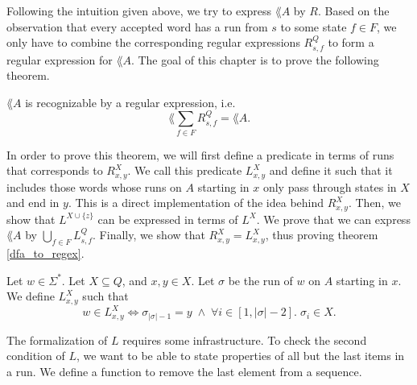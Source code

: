 

Following the intuition given above, we try to express $\lang{A}$ by $R$.
Based on the observation that every accepted word has a run from $s$ to some state $f \in F$, 
we only have to combine the corresponding regular expressions $R^Q_{s,f}$ to form a regular expression for $\lang{A}$.
The goal of this chapter is to prove the following theorem. 

\begin{theorem}
    \label{dfa_to_regex} $\lang{A}$ is recognizable by a regular expression, i.e.
    \begin{equation*}
        \lang{\sum\limits_{f \in F} R^Q_{s,f}} = \lang{A}.
    \end{equation*}
\end{theorem}

In order to prove this theorem, we will first define a predicate in terms of runs that corresponds to $R^X_{x,y}$.
We call this predicate $L^X_{x,y}$ and define it such that it includes those words 
whose runs on $A$ starting in $x$ only pass through states in $X$ and end in $y$.
This is a direct implementation of the idea behind $R^X_{x,y}$.
Then, we show that $L^{X \cup \{z\}}$ can be expressed in terms of $L^X$.
We prove that we can express $\lang{A}$ by $\bigcup_{f\in F} L^Q_{s,f}$.
Finally, we show that $R^X_{x,y} = L^X_{x,y}$, thus proving theorem \ref{dfa_to_regex}.

\begin{definition}
    Let $w \in \Sigma^*$.
    Let $X \subseteq Q$, and $x,y \in X$.
    Let $\sigma$ be the run of $w$ on $A$ starting in $x$.
    We define $L^X_{x,y}$ such that
    \begin{equation*}
        w \in L^X_{x,y} \iff \sigma_{|\sigma|-1} = y \; \wedge \; \forall i \in [1,|\sigma|-2]. \; \sigma_i \in X.
    \end{equation*}
\end{definition}

The formalization of $L$ requires some infrastructure. 
To check the second condition of $L$, we want to be able to state properties of all but the last items in a run.
We define a function to remove the last element from a sequence.




